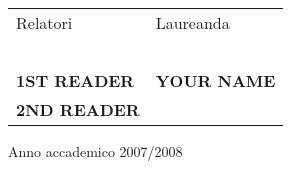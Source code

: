 \begin{titlepage}
\begin{center}
        \vspace{2.5cm}
    \end{center}
\begin{center}
    \begin{tabular}{ll}
        \large{Relatori} & \hspace{5 cm} \large{Laureanda}\\
        \small{\ } & \small{ }\\
        \large{\textbf{1ST READER}} & \hspace{5 cm}
        \large{\textbf{YOUR NAME}}\\
        \large{\textbf{2ND READER}} & \hspace{5 cm}\\
    \end{tabular}
\end{center}
    \vspace{1.5cm}
    \begin{center}\begin{large}Anno accademico 2007/2008\end{large}\end{center}
\end{titlepage}

